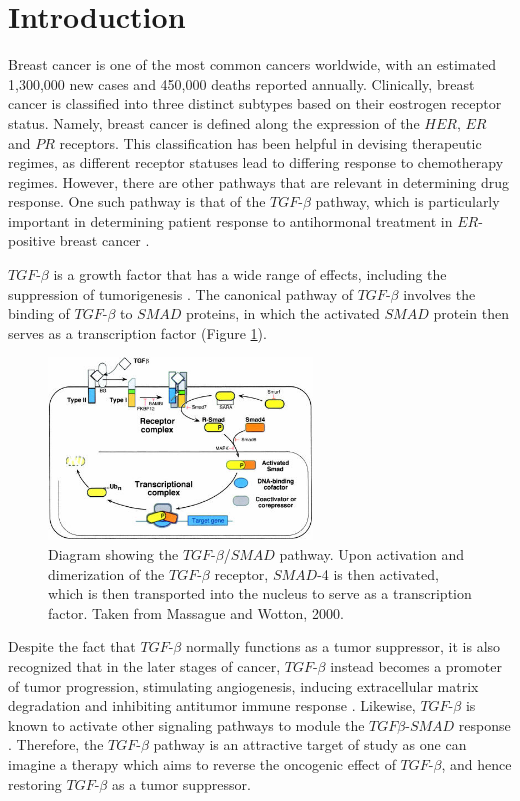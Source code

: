 \documentclass[a4paper,12pt]{article}
\begin{document}
\newpage
\section{Introduction}
Breast cancer is one of the most common cancers worldwide, with an
estimated 1,300,000 new cases and 450,000 deaths reported
annually. Clinically,  breast cancer is classified into three distinct
subtypes based on their eostrogen receptor status. Namely, breast
cancer is defined along the expression of the $\textit{HER}$,
$\textit{ER}$ and $\textit{PR}$ receptors. This classification
has been helpful in devising therapeutic regimes, as different
receptor statuses lead to differing response to chemotherapy regimes\cite{Rouzier2005}. However, there are other pathways that are
relevant in determining drug response. One such pathway is that of the
$\textit{TGF}$-$\beta$ pathway, which is particularly important in
determining patient response to antihormonal treatment in $\textit{ER}$-positive breast cancer \cite{knabbe1987}.

$\textit{TGF}$-$\beta$ is a growth factor that has a wide range of
effects, including the suppression of tumorigenesis \cite{yang2010}. The canonical pathway of $\textit{TGF}$-$\beta$ involves the binding of
$\textit{TGF}$-$\beta$ to $\textit{SMAD}$ proteins, in which the
activated $\textit{SMAD}$ protein then serves as a transcription
factor (Figure \ref{SMAD}).
\begin{figure}[htbp!]
\centering
\includegraphics[width=7cm]{smad.jpg}
\caption[Diagram showing the $\textit{TGF}$-$\beta$/$\textit{SMAD}$
pathway]
{Diagram showing the $\textit{TGF}$-$\beta$/$\textit{SMAD}$
  pathway. Upon activation and dimerization of the
  $\textit{TGF}$-$\beta$ receptor, $\textit{SMAD}$-4 is then
  activated, which is then transported into the nucleus to serve as a
  transcription factor. Taken from Massague and Wotton, 2000.}
\label{SMAD}
\end{figure}
Despite the fact that  $\textit{TGF}$-$\beta$ normally
functions as a tumor suppressor, it is also recognized that in the
later stages of cancer,  $\textit{TGF}$-$\beta$ instead becomes a
promoter of tumor progression, stimulating angiogenesis, inducing
extracellular matrix degradation and inhibiting antitumor immune
response \cite{McEarchern2001,Bierie2006}. Likewise,
$\textit{TGF}$-$\beta$ is known to activate other signaling pathways
to module the $\textit{TGF}$$\beta$-$\textit{SMAD}$ response \cite{Zhang2009}. Therefore, the $\textit{TGF}$-$\beta$ pathway is an
attractive target of study as one can imagine a therapy which aims to
reverse the oncogenic effect of $\textit{TGF}$-$\beta$, and hence
restoring $\textit{TGF}$-$\beta$ as a tumor suppressor.
\end{document}

